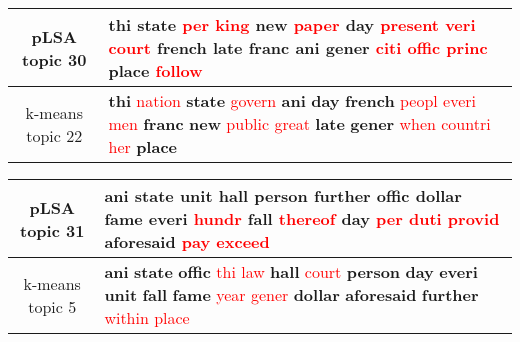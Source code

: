 \begin{center}\begin{tabularx}{\textwidth} {
  | c | >{\raggedright\arraybackslash}X | } \hline 
pLSA topic 30 & \textbf{thi} \textbf{state} \textcolor{red}{per} \textcolor{red}{king} \textbf{new} \textcolor{red}{paper} \textbf{day} \textcolor{red}{present} \textcolor{red}{veri} \textcolor{red}{court} \textbf{french} \textbf{late} \textbf{franc} \textbf{ani} \textbf{gener} \textcolor{red}{citi} \textcolor{red}{offic} \textcolor{red}{princ} \textbf{place} \textcolor{red}{follow} \\ \hline 
k-means topic 22 & \textbf{thi} \textcolor{red}{nation} \textbf{state} \textcolor{red}{govern} \textbf{ani} \textbf{day} \textbf{french} \textcolor{red}{peopl} \textcolor{red}{everi} \textcolor{red}{men} \textbf{franc} \textbf{new} \textcolor{red}{public} \textcolor{red}{great} \textbf{late} \textbf{gener} \textcolor{red}{when} \textcolor{red}{countri} \textcolor{red}{her} \textbf{place} \\ \hline 
\end{tabularx}

\end{center}

\begin{center}\begin{tabularx}{\textwidth} {
  | c | >{\raggedright\arraybackslash}X | } \hline 
pLSA topic 31 & \textbf{ani} \textbf{state} \textbf{unit} \textbf{hall} \textbf{person} \textbf{further} \textbf{offic} \textbf{dollar} \textbf{fame} \textbf{everi} \textcolor{red}{hundr} \textbf{fall} \textcolor{red}{thereof} \textbf{day} \textcolor{red}{per} \textcolor{red}{duti} \textcolor{red}{provid} \textbf{aforesaid} \textcolor{red}{pay} \textcolor{red}{exceed} \\ \hline 
k-means topic 5 & \textbf{ani} \textbf{state} \textbf{offic} \textcolor{red}{thi} \textcolor{red}{law} \textbf{hall} \textcolor{red}{court} \textbf{person} \textbf{day} \textbf{everi} \textbf{unit} \textbf{fall} \textbf{fame} \textcolor{red}{year} \textcolor{red}{gener} \textbf{dollar} \textbf{aforesaid} \textbf{further} \textcolor{red}{within} \textcolor{red}{place} \\ \hline 
\end{tabularx}

\end{center}

